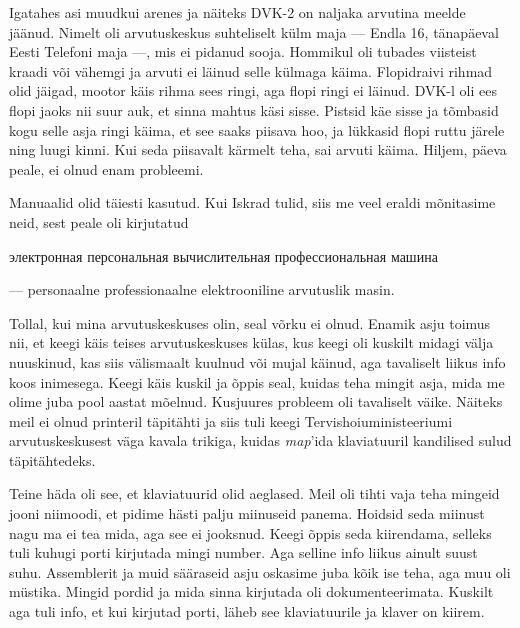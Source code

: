 Igatahes asi muudkui arenes ja näiteks DVK-2 on naljaka arvutina 
meelde jäänud. Nimelt oli arvutuskeskus suhteliselt külm maja --- Endla 16, 
tänapäeval Eesti Telefoni maja ---, mis ei pidanud sooja. Hommikul oli tubades viisteist kraadi või 
vähemgi ja arvuti ei läinud selle külmaga käima. Flopidraivi rihmad olid 
jäigad, mootor käis rihma sees ringi, aga flopi ringi ei läinud. 
DVK-l oli ees flopi jaoks nii suur auk, et sinna mahtus käsi sisse. 
Pistsid käe sisse ja tõmbasid kogu selle asja ringi käima, et see saaks piisava hoo, 
ja lükkasid flopi ruttu järele ning luugi kinni. Kui seda piisavalt kärmelt 
teha, sai arvuti käima. Hiljem, päeva peale, ei olnud enam probleemi. 


Manuaalid olid täiesti kasutud. Kui Iskrad 
tulid, siis me veel eraldi mõnitasime neid, sest peale oli kirjutatud 
\begin{russian}электронная персональная вычислительная профессиональная 
машина\end{russian} --- personaalne professionaalne elektrooniline arvutuslik 
masin. 


Tollal, kui mina arvutuskeskuses olin, seal võrku ei 
olnud. Enamik asju toimus nii, et keegi käis teises 
arvutuskeskuses külas, kus keegi oli kuskilt midagi välja nuuskinud, kas siis välismaalt kuulnud või mujal käinud, aga tavaliselt liikus info koos 
inimesega. Keegi käis kuskil ja õppis seal, kuidas teha 
mingit asja, mida me olime juba pool aastat mõelnud. Kusjuures probleem oli 
tavaliselt väike. Näiteks meil ei olnud printeril täpitähti ja siis tuli keegi Tervishoiuministeeriumi arvutuskeskusest 
väga kavala trikiga, kuidas \emph{map}'ida klaviatuuril kandilised sulud 
täpitähtedeks.

Teine häda oli see, et klaviatuurid olid aeglased. Meil oli tihti vaja teha
mingeid jooni niimoodi, et pidime hästi palju miinuseid panema. Hoidsid seda miinust 
nagu ma ei tea mida, aga see ei jooksnud. Keegi õppis seda 
kiirendama, selleks tuli kuhugi porti kirjutada mingi number. Aga selline info 
liikus ainult suust suhu. Assemblerit ja muid sääraseid asju oskasime juba 
kõik ise teha, aga muu oli müstika. Mingid pordid ja mida sinna 
kirjutada oli dokumenteerimata. Kuskilt aga tuli info, et kui kirjutad porti, läheb see klaviatuurile ja klaver on kiirem. 

